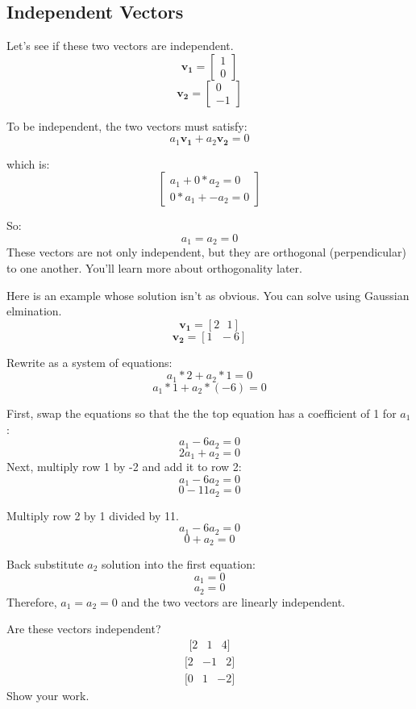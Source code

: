\subsection{Independent Vectors}
Let's see if these two vectors are independent.
$$\mathbf{v_1} = \begin{bmatrix}
1 \\
0
\end{bmatrix}$$
$$\mathbf{v_2} = \begin{bmatrix}
0 \\
-1
\end{bmatrix}$$

To be independent, the two vectors must satisfy:
	$$a_1 \mathbf{v_1} + a_2 \mathbf{v_2} = 0$$
	
which is:
$$\begin{bmatrix}
	a_1 + 0*a_2 = 0 \\
	0*a_1 + -a_2 = 0
\end{bmatrix}$$

So:
$$a_1 = a_2 = 0$$
These vectors are not only independent, but they are orthogonal (perpendicular)
to one another. You'll learn more about orthogonality later.

Here is an example whose solution isn't as obvious. You can solve using 
Gaussian elmination.
$$\mathbf{v_1} = [2\text{ } 1]$$
$$\mathbf{v_2} = [1 \text{ }-6]$$

Rewrite as a system of equations:
$$a_1*2 + a_2*1 = 0 $$
$$a_1*1 + a_2*(-6) = 0$$

First, swap the equations so that the the top equation has a coefficient of 1 
for $a_1$:
$$a_1 - 6a_2 = 0$$ 
$$2a_1 + a_2 = 0$$ 
Next, multiply row 1 by -2 and add it to row 2:
$$a_1 - 6a_2 = 0$$ 
$$0  - 11a_2 = 0$$ 

Multiply row 2 by 1 divided by 11.
$$a_1 - 6a_2 = 0$$ 
$$0 + a_2 = 0$$ 

Back substitute $a_2$ solution into the first equation:
$$a_1  = 0$$
$$a_2 = 0$$ 
Therefore, $a_1 = a_2 = 0$ and the two vectors are linearly independent.

\begin{Exercise}[title={Vector Independence}, label=vector_independence]
    Are these vectors independent? 
$$\begin{matrix}[2 & 1  & 4]\end{matrix}$$
$$\begin{matrix}[2  & -1  & 2]\end{matrix}$$ 
$$\begin{matrix}[0  & 1  & -2]\end{matrix}$$
Show your work.
\end{Exercise}

